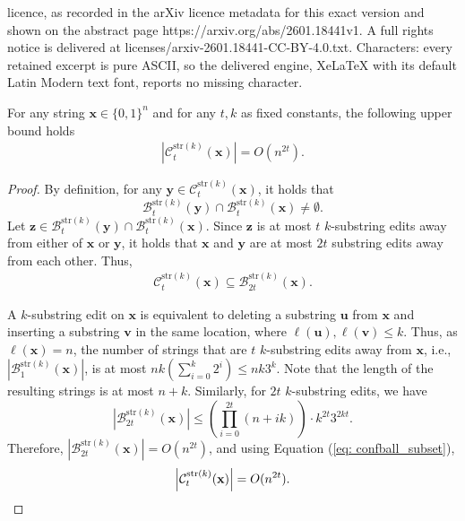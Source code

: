 \documentclass[10pt,a4paper]{amsart}
\newcommand{\bfx}{{\mathbf{ x}}}
\newcommand{\bfy}{{\mathbf{ y}}}
\newcommand{\bl}{n}
\newcommand{\confball}[3]{\mathcal{C}_{#1}^{#2}(#3)}
\newcommand{\editball}[3]{\mathcal{B}_{#1}^{#2}(#3)}
\newcommand{\editsize}{k}
\newcommand{\length}[1]{{\ell}(#1)}
\newcommand{\numedits}{t}
\newcommand{\tksub}{$\numedits$ $\editsize$-substring\xspace}
\begin{document}
licence, as recorded in the arXiv licence metadata for this exact version and shown on the abstract page https://arxiv.org/abs/2601.18441v1. A full rights notice is delivered at licenses/arxiv-2601.18441-CC-BY-4.0.txt. Characters: every retained excerpt is pure ASCII, so the delivered engine, XeLaTeX with its default Latin Modern text font, reports no missing character.
\begin{lemma}
\label{lem:confusion ball general case}
    For any string $\mathbf{x} \in \{0,1\}^\bl$ and for any $\numedits,\editsize$ as fixed constants, the following upper bound holds
    \begin{align*}
        |\confball{\numedits}{\mathrm{str}(\editsize)}{\mathbf{x}}| = O(\bl^{2\numedits}).
    \end{align*}  
\end{lemma}

\begin{proof}
    By definition, for any $ \mathbf{y} \in \confball{\numedits}{\mathrm{str}(\editsize)}{\mathbf{x}}$, it holds that $$\editball{\numedits}{\mathrm{str}(\editsize)}{\mathbf{y}} \cap \editball{\numedits}{\mathrm{str}(\editsize)}{\mathbf{x}}\neq \emptyset.$$ Let $\mathbf{z} \in \editball{\numedits}{\mathrm{str}(\editsize)}{\mathbf{y}} \cap \editball{\numedits}{\mathrm{str}(\editsize)}{\mathbf{x}}$. Since $\mathbf{z}$ is at most \tksub edits away from either of $\bfx$ or $\bfy$, it holds that $\bfx$ and $\bfy$ are at most $2\numedits$ substring edits away from each other. Thus, 
    \begin{align}
    \label{eq: confball_subset}
        \confball{\numedits}{\mathrm{str}(\editsize)}{\mathbf{x}} \subseteq \editball{2\numedits}{\mathrm{str}(k)}{\mathbf{x}}.
    \end{align}
    
    A $\editsize$-substring edit on $\mathbf{x}$ is equivalent to deleting a substring $\mathbf{u}$ from $\mathbf{x}$ and inserting a substring $\mathbf{v}$ in the same location, where $\length{\mathbf{u}}, \length{\mathbf{v}} \leq \editsize$. Thus, as $\length{\mathbf{x}} = n$, the number of strings that are \tksub edits away from $\mathbf{x}$, i.e., $\left|\editball{1}{\mathrm{str}(k)}{\mathbf{x}}\right|$, is at most $\bl\editsize(\sum_{i=0}^\editsize 2^i) \leq \bl\editsize3^\editsize$. Note that the length of the resulting strings is at most $\bl+\editsize$. 
    Similarly, for $2\numedits$ $\editsize$-substring edits, we have
    \begin{equation}\label{eq:ballsize}
        \left|\editball{2\numedits}{\mathrm{str}(k)}{\mathbf{x}}\right| \leq \left(\prod_{i=0}^{2\numedits}(n+i\editsize)\right)\cdot\editsize^{2\numedits} 3^{2\editsize\numedits}.
    \end{equation}
    Therefore, $\left|\editball{2\numedits}{\mathrm{str}(k)}{\mathbf{x}}\right|= O(\bl^{2t})$, and  using Equation (\ref{eq: confball_subset}), 
    \begin{equation*}
        \left|\confball{\numedits}{\mathrm{str}(\editsize)}{\mathbf{x}}\right| = O(\bl^{2t}).\qedhere
    \end{equation*}
\end{proof}
\end{document}
